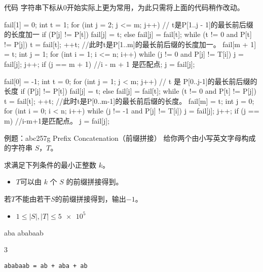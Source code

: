 \documentclass{ctexbeamer}
\begin{document}
\begin{frame}[fragile]{代码}
字符串下标从$0$开始实际上更为常用，为此只需将上面的代码稍作改动。

\begin{tcolorbox}[sidebyside]
\begin{cverb}
fail[1] = 0;
int t = 1;
for (int j = 2; j <= m; j++) {
// t是P[1..j - 1]的最长前后缀的长度加一
  if (P[j] != P[t])
    fail[j] = t;
  else
    fail[j] = fail[t];
  while (t != 0 and P[t] != P[j])
    t = fail[t];
  ++t;
}
//此时t是P[1..m]的最长前后缀的长度加一。
fail[m + 1] = t;
int j = 1;
for (int i = 1; i <= n; i++) {
  while (j != 0 and P[j] != T[i])
    j = fail[j];
  j++;
  if (j == m + 1) {
    //i - m + 1 是匹配点;
    j = fail[j];
  }
}
\end{cverb}
\tcblower
\begin{cverb}[fontsize=\tiny]
fail[0] = -1;
int t = 0;
for (int j = 1; j < m; j++) {
// t 是 P[0..j-1]的最长前后缀的长度
  if (P[j] != P[t])
    fail[j] = t;
  else
    fail[j] = fail[t];
  while (t != 0 and P[t] != P[j])
    t = fail[t];
  ++t;
}
//此时t是P[0..m-1]的最长前后缀的长度。
fail[m] = t;
int j = 0;
for (int i = 0; i < n; i++) {
  while (j != -1 and P[j] != T[i])
    j = fail[j];
  j++;
  if (j == m) {
    //i-m+1是匹配点。
    j = fail[j];
  }
}
\end{cverb}
\end{tcolorbox}

\end{frame}


\begin{frame}[fragile]{例题：abc257g Prefix Concatenation（前缀拼接）}
给你两个由小写英文字母构成的字符串 $S$，$T$。

求满足下列条件的最小正整数 $k$。
\begin{itemize}
    \item $T$可以由 $k$ 个 $S$ 的前缀拼接得到。
\end{itemize}
若$T$不能由若干$S$的前缀拼接得到，输出$-1$。

\begin{itemize}
    \item $1 \le |S|, |T| \le \num{5e5}$
\end{itemize}

\begin{tcolorbox}[sidebyside,title=样例]
\begin{cverb}
aba
ababaab
\end{cverb}
\tcblower
\begin{cverb}
3
\end{cverb}
\end{tcolorbox}
\verb|ababaab = ab + aba + ab|
\end{frame}
\end{document}
